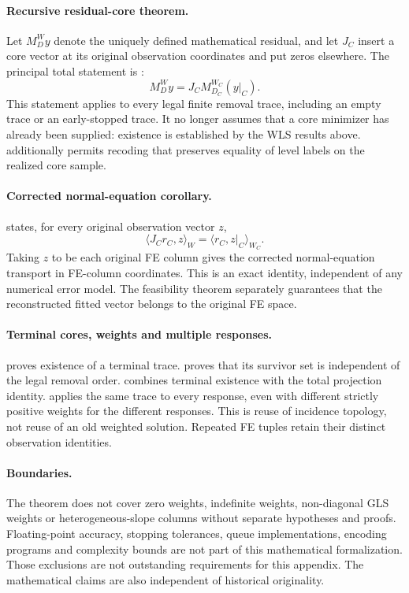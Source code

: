 \paragraph{Recursive residual-core theorem.}
Let $M_D^W y$ denote the uniquely defined mathematical residual, and let $J_C$
insert a core vector at its original observation coordinates and put zeros
elsewhere. The principal total statement is
:
\[
 M_D^W y = J_C M_{D_C}^{W_C}(y|_C).
\]
This statement applies to every legal finite removal trace, including an empty
trace or an early-stopped trace. It no longer assumes that a core minimizer has
already been supplied: existence is established by the WLS results above.
 additionally permits recoding that
preserves equality of level labels on the realized core sample.

\paragraph{Corrected normal-equation corollary.}
 states, for every original observation vector $z$,
\[
 \langle J_C r_C,z\rangle_W=\langle r_C,z|_C\rangle_{W_C}.
\]
Taking $z$ to be each original FE column gives the corrected normal-equation
transport in FE-column coordinates. This is an exact identity, independent of
any numerical error model. The feasibility theorem separately guarantees that
the reconstructed fitted vector belongs to the original FE space.

\paragraph{Terminal cores, weights and multiple responses.}
 proves existence of a terminal trace.
 proves that its survivor set is independent
of the legal removal order. 
combines terminal existence with the total projection identity.
 applies the same trace to every response,
even with different strictly positive weights for the different responses.
This is reuse of incidence topology, not reuse of an old weighted solution.
Repeated FE tuples retain their distinct observation identities.

\paragraph{Boundaries.}
The theorem does not cover zero weights, indefinite weights, non-diagonal GLS
weights or heterogeneous-slope columns without separate hypotheses and proofs.
Floating-point accuracy, stopping tolerances, queue implementations, encoding
programs and complexity bounds are not part of this mathematical formalization.
Those exclusions are not outstanding requirements for this appendix.
The mathematical claims are also independent of historical originality.
